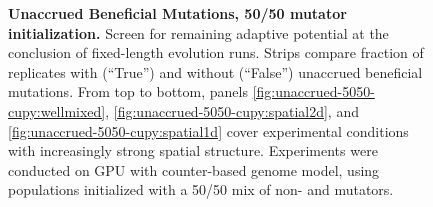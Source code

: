 \begin{figure}[h]
  \begin{minipage}{\textwidth}
    \caption{%
      \textbf{Unaccrued Beneficial Mutations, 50/50 mutator initialization.}
      \footnotesize
      Screen for remaining adaptive potential at the conclusion of fixed-length evolution runs.
      Strips compare fraction of replicates with (``True'') and without (``False'') unaccrued beneficial mutations.
      From top to bottom, panels \ref{fig:unaccrued-5050-cupy:wellmixed}, \ref{fig:unaccrued-5050-cupy:spatial2d}, and \ref{fig:unaccrued-5050-cupy:spatial1d} cover experimental conditions with increasingly strong spatial structure.
      Experiments were conducted on GPU with counter-based genome model, using populations initialized with a 50/50 mix of non- and mutators.
    }
    \label{fig:unaccrued-5050-cupy}
  \end{minipage}
\end{figure}
